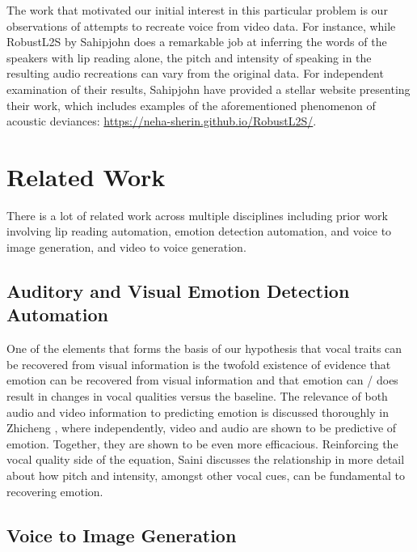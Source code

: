 \documentclass[10pt,twocolumn,letterpaper]{article}
\begin{document}
The work that motivated our initial interest in this particular problem is our observations of attempts to  recreate voice from video data. For instance, while RobustL2S by Sahipjohn \etal \cite{RobustL2S} does a remarkable job at inferring the words of the speakers with lip reading alone, the pitch and intensity of speaking in the resulting audio recreations can vary from the original data. For independent examination of their results, Sahipjohn \etal have provided a stellar website presenting their work, which includes examples of the aforementioned phenomenon of acoustic deviances: \href{https://neha-sherin.github.io/RobustL2S/}{https://neha-sherin.github.io/RobustL2S/}.

\section{Related Work}
\label{sec:related}

There is a lot of related work across multiple disciplines including prior work involving lip reading automation, emotion detection automation, and voice to image generation, and video to voice generation. 


\subsection{Auditory and Visual Emotion Detection Automation}

One of the elements that forms the basis of our hypothesis that vocal traits can be recovered from visual information is the twofold existence of evidence that emotion can be recovered from visual information and that emotion can / does result in changes in vocal qualities versus the baseline. The relevance of both audio and video information to predicting emotion is discussed thoroughly in Zhicheng  \cite{EmotVid2023}, where independently, video and audio are shown to be predictive of emotion. Together, they are shown to be even more efficacious. Reinforcing the vocal quality side of the equation, Saini \cite{EmotPitch2023} discusses the relationship in more detail about how pitch and intensity, amongst other vocal cues, can be fundamental to recovering emotion.

\subsection{Voice to Image Generation}
\end{document}
